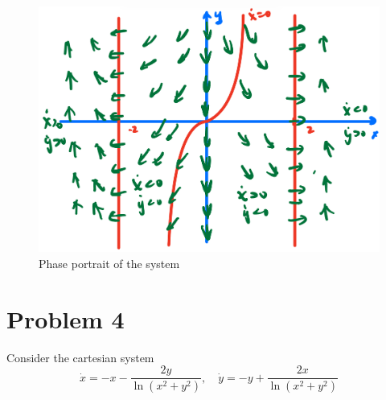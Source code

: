 \documentclass[12pt]{exam}
\begin{document}
\begin{enumerate}[(a)]
\begin{figure}[H]
		\includegraphics[width=0.8\linewidth]{3b.jpeg}
		\caption{Phase portrait of the system}
		\label{fig:3b}
	\end{figure}

\end{enumerate}


\section*{Problem 4}
Consider the cartesian system
\[ \dot{x} = -x-\frac{2y}{\ln(x^2+y^2)}, \quad \dot{y} = -y+\frac{2x}{\ln(x^2+y^2)} \]
\end{document}
